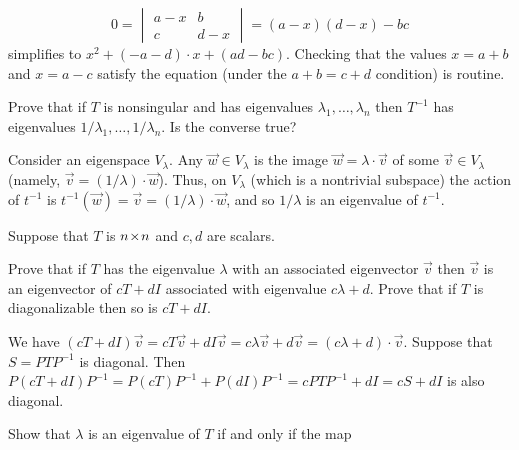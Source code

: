 \begin{exercises}
\begin{answer}
\begin{equation*}
        0=
        \begin{vmatrix}
          a-x  &b  \\
          c    &d-x 
        \end{vmatrix}
        =(a-x)(d-x)-bc
      \end{equation*}
      simplifies to $x^2+(-a-d)\cdot x + (ad-bc)$.
      Checking that the values $x=a+b$ and $x=a-c$ satisfy the equation 
      (under the $a+b=c+d$ condition) is routine. 
    \end{answer}
  \recommended \item
    Prove that if \( T \) is nonsingular and has eigenvalues
    \( \lambda_1,\dots,\lambda_n \) then \( T^{-1} \) has eigenvalues
    \( 1/\lambda_1,\dots,1/\lambda_n \).
    Is the converse true?
    \begin{answer}
      Consider an eigenspace $V_{\lambda}$.
      Any $\vec{w}\in V_{\lambda}$ is the image
      $\vec{w}=\lambda\cdot\vec{v}$ of some $\vec{v}\in V_{\lambda}$ 
      (namely, $\vec{v}=(1/\lambda)\cdot\vec{w}$).
      Thus, on $V_{\lambda}$ (which is a nontrivial subspace) 
      the action of $t^{-1}$ is 
      $t^{-1}(\vec{w})=\vec{v}=(1/\lambda)\cdot\vec{w}$,
      and so $1/\lambda$ is an eigenvalue of $t^{-1}$.
    \end{answer}
  \recommended \item
    Suppose that \( T \) is \( n \! \times \! n \) and \( c,d \) are scalars.
    \begin{exparts}
      \partsitem Prove that if \( T \) has the eigenvalue 
        \( \lambda \) with an associated
        eigenvector \( \vec{v} \) then \( \vec{v} \) is an eigenvector of
        \( cT+dI \) associated with eigenvalue \( c\lambda+d \).
      \partsitem Prove that if \( T \) is diagonalizable then so is
        \( cT+dI \).
    \end{exparts}
    \begin{answer}
      \begin{exparts}
        \partsitem We have 
          $(cT+dI)\vec{v}=cT\vec{v}+dI\vec{v}=c\lambda\vec{v}+d\vec{v}
               =(c\lambda+d)\cdot \vec{v}$.
        \partsitem Suppose that $S=PTP^{-1}$ is diagonal.
          Then $P(cT+dI)P^{-1}=P(cT)P^{-1}+P(dI)P^{-1}
                 =cPTP^{-1}+dI=cS+dI$ is also diagonal.
      \end{exparts}
    \end{answer}
  \recommended \item
    Show that \( \lambda \) is an eigenvalue of \( T \) if and only if the map

\end{exercises}
